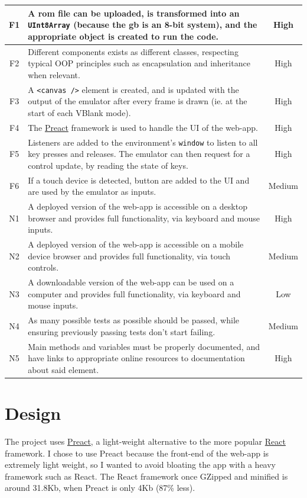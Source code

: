 \documentclass[11pt]{report}
\begin{document}
\begin{xltabular}{\textwidth}{|c|X|c|}
    F1 & A \gls{rom} file can be uploaded, is transformed into an \texttt{UInt8Array} (because the \gls{gb} is an 8-bit system), and the appropriate object is created to run the code. & High \\ \hline
    F2 & Different components exists as different classes, respecting typical OOP principles such as encapsulation and inheritance when relevant. & High \\ \hline
    F3 & A \texttt{<canvas />} element is created, and is updated with the output of the emulator after every frame is drawn (ie. at the start of each VBlank mode). & High \\ \hline
    F4 & The \href{https://preactjs.com/}{Preact} framework is used to handle the UI of the web-app. & High \\ \hline
    F5 & Listeners are added to the environment's \texttt{window} to listen to all key presses and releases. The emulator can then request for a control update, by reading the state of keys. & High \\ \hline
    F6 & If a touch device is detected, button are added to the UI and are used by the emulator as inputs. & Medium \\ \hline

    N1 & A deployed version of the web-app is accessible on a desktop browser and provides full functionality, via keyboard and mouse inputs. & High \\ \hline
    N2 & A deployed version of the web-app is accessible on a mobile device browser and provides full functionality, via touch controls. & Medium \\ \hline
    N3 & A downloadable version of the web-app can be used on a computer and provides full functionality, via keyboard and mouse inputs. & Low \\ \hline
    N4 & As many possible tests as possible should be passed, while ensuring previously passing tests don't start failing. & Medium \\ \hline
    N5 & Main methods and variables must be properly documented, and have links to appropriate online resources to documentation about said element. & High \\ \hline
\end{xltabular}

\chapter{Design}

The project uses \href{https://preactjs.com/}{Preact}, a light-weight alternative to the more popular \href{https://reactjs.org/}{React} framework. I chose to use Preact because the front-end of the web-app is extremely light weight, so I wanted to avoid bloating the app with a heavy framework such as React. The React framework once GZipped and minified is around 31.8Kb, when Preact is only 4Kb (87\% less).
\end{document}

